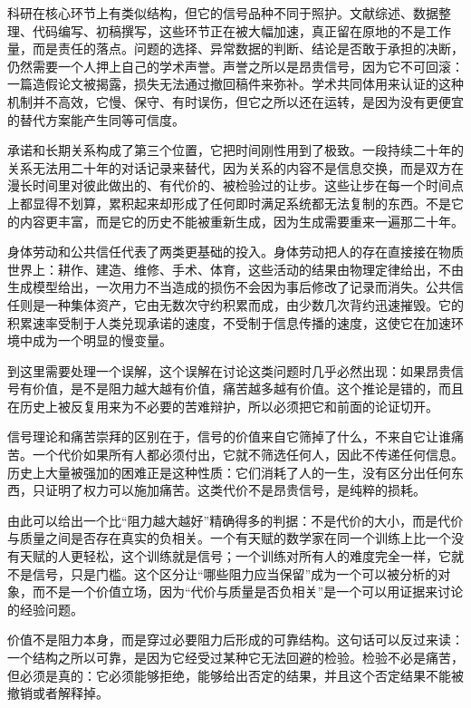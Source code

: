 科研在核心环节上有类似结构，但它的信号品种不同于照护。文献综述、数据整理、代码编写、初稿撰写，这些环节正在被大幅加速，真正留在原地的不是工作量，而是责任的落点。问题的选择、异常数据的判断、结论是否敢于承担的决断，仍然需要一个人押上自己的学术声誉。声誉之所以是昂贵信号，因为它不可回滚：一篇造假论文被揭露，损失无法通过撤回稿件来弥补。学术共同体用来认证的这种机制并不高效，它慢、保守、有时误伤，但它之所以还在运转，是因为没有更便宜的替代方案能产生同等可信度。

承诺和长期关系构成了第三个位置，它把时间刚性用到了极致。一段持续二十年的关系无法用二十年的对话记录来替代，因为关系的内容不是信息交换，而是双方在漫长时间里对彼此做出的、有代价的、被检验过的让步。这些让步在每一个时间点上都显得不划算，累积起来却形成了任何即时满足系统都无法复制的东西。不是它的内容更丰富，而是它的历史不能被重新生成，因为生成需要重来一遍那二十年。

身体劳动和公共信任代表了两类更基础的投入。身体劳动把人的存在直接接在物质世界上：耕作、建造、维修、手术、体育，这些活动的结果由物理定律给出，不由生成模型给出，一次用力不当造成的损伤不会因为事后修改了记录而消失。公共信任则是一种集体资产，它由无数次守约积累而成，由少数几次背约迅速摧毁。它的积累速率受制于人类兑现承诺的速度，不受制于信息传播的速度，这使它在加速环境中成为一个明显的慢变量。


到这里需要处理一个误解，这个误解在讨论这类问题时几乎必然出现：如果昂贵信号有价值，是不是阻力越大越有价值，痛苦越多越有价值。这个推论是错的，而且在历史上被反复用来为不必要的苦难辩护，所以必须把它和前面的论证切开。

信号理论和痛苦崇拜的区别在于，信号的价值来自它筛掉了什么，不来自它让谁痛苦。一个代价如果所有人都必须付出，它就不筛选任何人，因此不传递任何信息。历史上大量被强加的困难正是这种性质：它们消耗了人的一生，没有区分出任何东西，只证明了权力可以施加痛苦。这类代价不是昂贵信号，是纯粹的损耗。

由此可以给出一个比“阻力越大越好”精确得多的判据：不是代价的大小，而是代价与质量之间是否存在真实的负相关。一个有天赋的数学家在同一个训练上比一个没有天赋的人更轻松，这个训练就是信号；一个训练对所有人的难度完全一样，它就不是信号，只是门槛。这个区分让“哪些阻力应当保留”成为一个可以被分析的对象，而不是一个价值立场，因为“代价与质量是否负相关”是一个可以用证据来讨论的经验问题。

价值不是阻力本身，而是穿过必要阻力后形成的可靠结构。这句话可以反过来读：一个结构之所以可靠，是因为它经受过某种它无法回避的检验。检验不必是痛苦，但必须是真的：它必须能够拒绝，能够给出否定的结果，并且这个否定结果不能被撤销或者解释掉。

